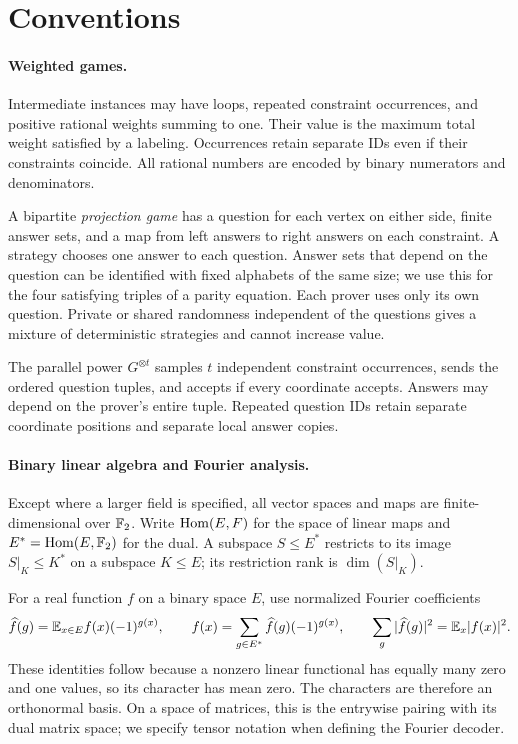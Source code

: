 \section{Conventions}\label{sec:preliminaries}

\paragraph{Weighted games.}
Intermediate instances may have loops, repeated constraint occurrences,
and positive rational weights summing to one. Their value is the maximum
total weight satisfied by a labeling. Occurrences retain separate IDs
even if their constraints coincide. All rational numbers are encoded by
binary numerators and denominators.

A bipartite \emph{projection game} has a question for each vertex on
either side, finite answer sets, and a map from left answers to right
answers on each constraint. A strategy chooses one answer to each
question. Answer sets that depend on the question can be identified
with fixed alphabets of the same size; we use this for the four
satisfying triples of a parity equation. Each prover uses only its own
question. Private or shared randomness independent of the questions
gives a mixture of deterministic strategies and cannot increase value.

The parallel power \(G^{\otimes t}\) samples \(t\) independent
constraint occurrences, sends the ordered question tuples, and accepts
if every coordinate accepts. Answers may depend on the prover's entire
tuple. Repeated question IDs retain separate coordinate positions and
separate local answer copies.

\paragraph{Binary linear algebra and Fourier analysis.}
Except where a larger field is specified, all vector spaces and maps
are finite-dimensional over \(\mathbb F_2\). Write \(\operatorname{Hom}(E,F)\) for the
space of linear maps and \(E^*=\operatorname{Hom}(E,\mathbb F_2)\) for the dual. A subspace
\(S\le E^*\) restricts to its image \(S|_K\le K^*\) on a subspace
\(K\le E\); its restriction rank is \(\dim(S|_K)\).

For a real function \(f\) on a binary space \(E\), use normalized
Fourier coefficients
\[
 \widehat f(g)=\mathbb E_{x\in E}f(x)(-1)^{g(x)},\qquad
 f(x)=\sum_{g\in E^*}\widehat f(g)(-1)^{g(x)},\qquad
 \sum_g|\widehat f(g)|^2=\mathbb E_x|f(x)|^2.
\]
These identities follow because a nonzero linear functional has equally
many zero and one values, so its character has mean zero. The characters
are therefore an orthonormal basis. On a space of matrices, this is
the entrywise pairing with its dual matrix space; we specify tensor
notation when defining the Fourier decoder.

